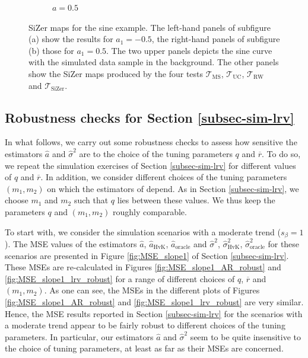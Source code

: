 \begin{figure}[p]
\begin{subfigure}[b]{0.475\textwidth}
\caption{$a=0.5$}
\end{subfigure}
\caption{SiZer maps for the sine example. The left-hand panels of subfigure (a) show the results for $a_1=-0.5$, the right-hand panels of subfigure (b) those for $a_1=0.5$. The two upper panels depicts the sine curve with the simulated data sample in the background. The other panels show the SiZer maps produced by the four tests $\mathcal{T}_{\text{MS}}$, $\mathcal{T}_{\text{UC}}$, $\mathcal{T}_{\text{RW}}$ and $\mathcal{T}_{\text{SiZer}}$.}\label{fig:sizer:sine}
\end{figure}  


\newpage
\subsection*{Robustness checks for Section \ref{subsec-sim-lrv}}


In what follows, we carry out some robustness checks to assess how sensitive the estimators $\widehat{a}$ and $\widehat{\sigma}^2$ are to the choice of the tuning parameters $q$ and $\overline{r}$. To do so, we repeat the simulation exercises of Section \ref{subsec-sim-lrv} for different values of $q$ and $\overline{r}$. In addition, we consider different choices of the tuning parameters $(m_1,m_2)$ on which the estimators of \cite{Hall2003} depend. As in Section \ref{subsec-sim-lrv}, we choose $m_1$ and $m_2$ such that $q$ lies between these values. We thus keep the parameters $q$ and $(m_1,m_2)$ roughly comparable. 


To start with, we consider the simulation scenarios with a moderate trend ($s_\beta = 1$). The MSE values of the estimators $\widehat{a}$, $\widehat{a}_{\text{HvK}}$, $\widehat{a}_{\text{oracle}}$ and $\widehat{\sigma}^2$, $\widehat{\sigma}^2_{\text{HvK}}$, $\widehat{\sigma}^2_{\text{oracle}}$ for these scenarios are presented in Figure \ref{fig:MSE_slope1} of Section \ref{subsec-sim-lrv}. These MSEs are re-calculated in Figures \ref{fig:MSE_slope1_AR_robust} and \ref{fig:MSE_slope1_lrv_robust} for a range of different choices of $q$, $\overline{r}$ and $(m_1,m_2)$. As one can see, the MSEs in the different plots of Figures \ref{fig:MSE_slope1_AR_robust} and \ref{fig:MSE_slope1_lrv_robust} are very similar. Hence, the MSE results reported in Section \ref{subsec-sim-lrv} for the scenarios with a moderate trend appear to be fairly robust to different choices of the tuning parameters. In particular, our estimators $\widehat{a}$ and $\widehat{\sigma}^2$ seem to be quite insensitive to the choice of tuning parameters, at least as far as their MSEs are concerned.


